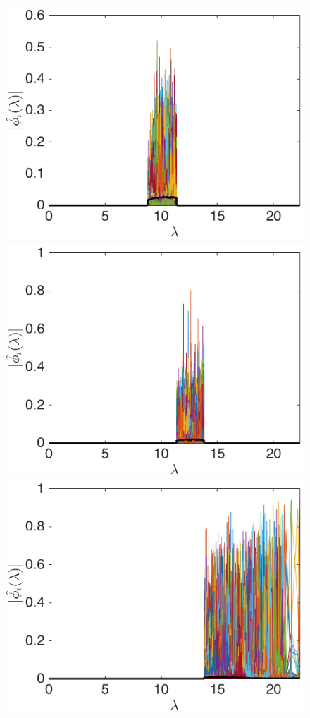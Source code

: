 \documentclass[journal, 10pt]{IEEEtran}
\begin{document}
\begin{figure}[bth]
\begin{minipage}[m]{0.16\linewidth}
\end{minipage}
\begin{minipage}[m]{0.16\linewidth}
\centerline{\includegraphics[width=.8\linewidth]{fig_bunny_freq_wav2a}}
\end{minipage}
\begin{minipage}[m]{0.16\linewidth}
\centerline{\includegraphics[width=.8\linewidth]{fig_bunny_freq_wav3a}}
\end{minipage}
\begin{minipage}[m]{0.16\linewidth}
\centerline{\includegraphics[width=.8\linewidth]{fig_bunny_freq_wav4a}}

\end{minipage}
\end{figure}
\end{document}
